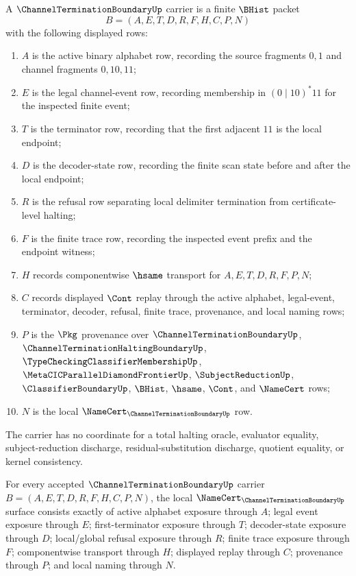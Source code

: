 \begin{definition}
\label{def:channel-termination-boundary-carrier}
A $\ChannelTerminationBoundaryUp$ carrier is a finite $\BHist$ packet
$$
B=(A,E,T,D,R,F,H,C,P,N)
$$
with the following displayed rows:
\begin{enumerate}
\item $A$ is the active binary alphabet row, recording the source fragments $0,1$ and channel fragments $0,10,11$;
\item $E$ is the legal channel-event row, recording membership in $(0\mid 10)^{*}11$ for the inspected finite event;
\item $T$ is the terminator row, recording that the first adjacent $11$ is the local endpoint;
\item $D$ is the decoder-state row, recording the finite scan state before and after the local endpoint;
\item $R$ is the refusal row separating local delimiter termination from certificate-level halting;
\item $F$ is the finite trace row, recording the inspected event prefix and the endpoint witness;
\item $H$ records componentwise $\hsame$ transport for $A,E,T,D,R,F,P,N$;
\item $C$ records displayed $\Cont$ replay through the active alphabet, legal-event, terminator, decoder, refusal, finite trace, provenance, and local naming rows;
\item $P$ is the $\Pkg$ provenance over $\ChannelTerminationBoundaryUp$, $\ChannelTerminationHaltingBoundaryUp$, $\TypeCheckingClassifierMembershipUp$, $\MetaCICParallelDiamondFrontierUp$, $\SubjectReductionUp$, $\ClassifierBoundaryUp$, $\BHist$, $\hsame$, $\Cont$, and $\NameCert$ rows;
\item $N$ is the local $\NameCert_{\ChannelTerminationBoundaryUp}$ row.
\end{enumerate}
The carrier has no coordinate for a total halting oracle, evaluator equality, subject-reduction discharge, residual-substitution discharge, quotient equality, or kernel consistency.
\end{definition}

\begin{theorem}
\label{thm:channel-termination-boundary-namecert-obligations}
For every accepted $\ChannelTerminationBoundaryUp$ carrier $B=(A,E,T,D,R,F,H,C,P,N)$, the local $\NameCert_{\ChannelTerminationBoundaryUp}$ surface consists exactly of active alphabet exposure through $A$; legal event exposure through $E$; first-terminator exposure through $T$; decoder-state exposure through $D$; local/global refusal exposure through $R$; finite trace exposure through $F$; componentwise transport through $H$; displayed replay through $C$; provenance through $P$; and local naming through $N$.
\end{theorem}

